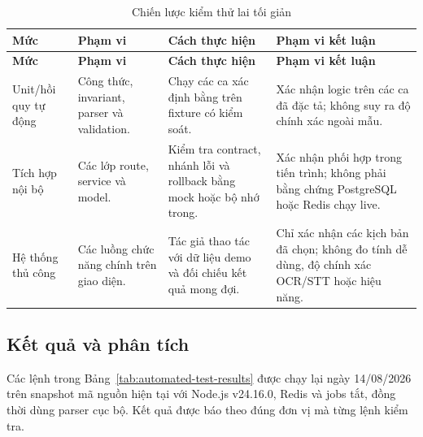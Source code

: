 \begin{longtable}{@{}L{2.4cm}L{3.5cm}L{4.3cm}L{4.0cm}@{}}
  \caption{Chiến lược kiểm thử lai tối giản}\label{tab:test-strategy}\\
  \toprule
  \textbf{Mức} & \textbf{Phạm vi} & \textbf{Cách thực hiện} & \textbf{Phạm vi kết luận} \\
  \midrule
  \endfirsthead
  \toprule
  \textbf{Mức} & \textbf{Phạm vi} & \textbf{Cách thực hiện} & \textbf{Phạm vi kết luận} \\
  \midrule
  \endhead
  Unit/hồi quy tự động & Công thức, invariant, parser và validation. & Chạy các ca xác định bằng  trên fixture có kiểm soát. & Xác nhận logic trên các ca đã đặc tả; không suy ra độ chính xác ngoài mẫu. \\
  Tích hợp nội bộ & Các lớp route, service và model. & Kiểm tra contract, nhánh lỗi và rollback bằng mock hoặc bộ nhớ trong. & Xác nhận phối hợp trong tiến trình; không phải bằng chứng PostgreSQL hoặc Redis chạy live. \\
  Hệ thống thủ công & Các luồng chức năng chính trên giao diện. & Tác giả thao tác với dữ liệu demo và đối chiếu kết quả mong đợi. & Chỉ xác nhận các kịch bản đã chọn; không đo tính dễ dùng, độ chính xác OCR/STT hoặc hiệu năng. \\
  \bottomrule
\end{longtable}

\subsection{Kết quả và phân tích}
\label{subsec:results}

Các lệnh trong Bảng~\ref{tab:automated-test-results} được chạy lại ngày 14/08/2026 trên snapshot mã nguồn hiện tại với Node.js v24.16.0, Redis và jobs tắt, đồng thời dùng parser cục bộ. Kết quả được báo theo đúng đơn vị mà từng lệnh kiểm tra.

